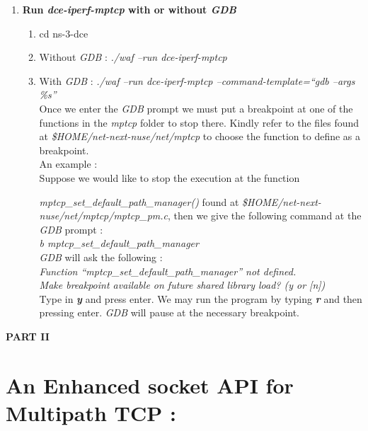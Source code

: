 \documentclass[a4paper,11pt]{article}
\begin{document}
\begin{enumerate}
			\item \textbf{Run \emph{dce-iperf-mptcp} with or without \emph{GDB}}
				\begin{enumerate}
					\item cd ns-3-dce
					\item Without \emph{GDB} : \emph{./waf --run dce-iperf-mptcp} \\
					\item With \emph{GDB} : \emph{./waf --run dce-iperf-mptcp --command-template=``gdb --args \%s''} \\
					Once we enter the \emph{GDB} prompt we must put a breakpoint at one of the functions in the \emph{mptcp} folder to stop there. Kindly refer to the files found at \emph{\$HOME/net-next-nuse/net/mptcp} to choose the function to define as a breakpoint. \\
					An example : \\
					Suppose we would like to stop the execution at the function \raggedright{\emph{mptcp\_set\_default\_path\_manager()}} found at \emph{\$HOME/net-next-nuse/net/mptcp/mptcp\_pm.c}, then we give the following command at the \emph{GDB} prompt : \\
					\emph{b mptcp\_set\_default\_path\_manager} \\
					\emph{GDB} will ask the following : \\
					\emph{Function ``mptcp\_set\_default\_path\_manager'' not defined.\\
					      Make breakpoint available on future shared library load? (y or [n])} \\
					Type in \textbf{\emph{y}} and press enter. We may run the program by typing \textbf{\emph{r}} and then pressing enter. \emph{GDB} will pause at the necessary breakpoint. \\
				\end{enumerate}

		\end{enumerate}






	\clearpage

	\begin{center}
		\LARGE\textbf{PART II}
	\end{center}

	\section{An Enhanced socket API for Multipath TCP : }
\end{document}
